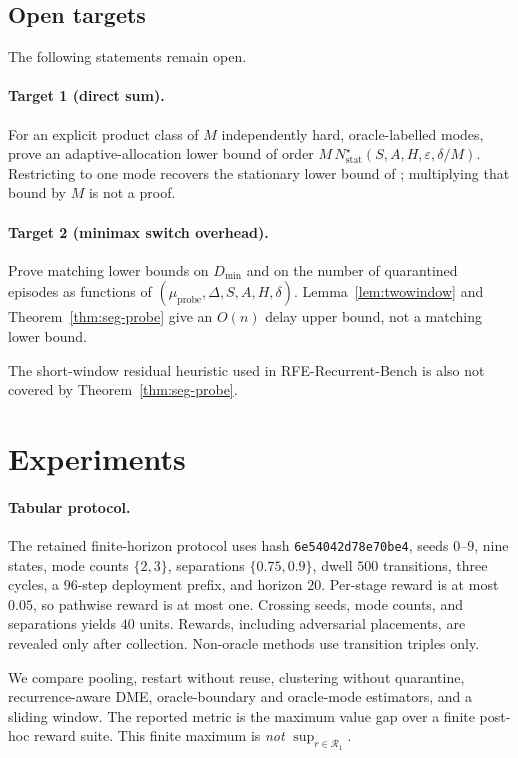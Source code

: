 \documentclass[11pt]{article}
\newcommand{\Rone}{\mathcal{R}_1}
\newcommand{\DME}{\textsc{DME}}
\newcommand{\eps}{\varepsilon}
\begin{document}
\subsection{Open targets}
\label{sec:targets}
The following statements remain open.

\paragraph{Target 1 (direct sum).}
For an explicit product class of $M$ independently hard, oracle-labelled
modes, prove an adaptive-allocation lower bound of order
$M\,N^\star_{\mathrm{stat}}(S,A,H,\eps,\delta/M)$. Restricting to one mode
recovers the stationary lower bound of \citet{jin2020rewardfree}; multiplying
that bound by $M$ is not a proof.

\paragraph{Target 2 (minimax switch overhead).}
Prove matching lower bounds on $D_{\min}$ and on the number of quarantined
episodes as functions of $(\mu_{\mathrm{probe}},\Delta,S,A,H,\delta)$.
Lemma~\ref{lem:twowindow} and Theorem~\ref{thm:seg-probe} give an
$O(n)$ delay upper bound, not a matching lower bound.

The short-window residual heuristic used in RFE-Recurrent-Bench is also not
covered by Theorem~\ref{thm:seg-probe}.

\section{Experiments}
\label{sec:exp}

\paragraph{Tabular protocol.}
The retained finite-horizon protocol uses hash
\texttt{6e54042d78e70be4}, seeds $0$--$9$, nine states, mode counts
$\{2,3\}$, separations $\{0.75,0.9\}$, dwell $500$ transitions, three cycles,
a $96$-step deployment prefix, and horizon $20$. Per-stage reward is at most
$0.05$, so pathwise reward is at most one. Crossing seeds, mode counts, and
separations yields $40$ units. Rewards, including adversarial placements, are
revealed only after collection. Non-oracle methods use transition triples
only.

We compare pooling, restart without reuse, clustering without quarantine,
recurrence-aware \DME, oracle-boundary and oracle-mode estimators, and a
sliding window. The reported metric is the maximum value gap over a finite
post-hoc reward suite. This finite maximum is \emph{not}
$\sup_{r\in\Rone}$.
\end{document}
